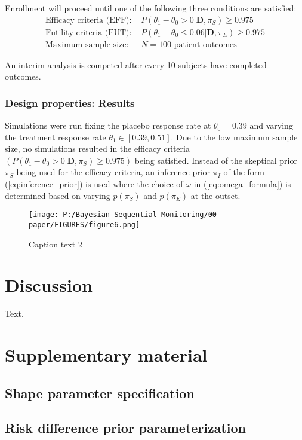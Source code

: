 \documentclass[12pt]{article}
\begin{document}
Enrollment will proceed until one of the following three conditions are satisfied:
\begin{align*}
\text{Efficacy criteria (EFF): }&P(\theta_1-\theta_0>0|\mathbf{D},\pi_S)\geq 0.975\\
\text{Futility criteria (FUT): }&P(\theta_1-\theta_0 \leq 0.06|\mathbf{D},\pi_E)\geq 0.975\\
\text{Maximum sample size: }&N=100 \text{ patient outcomes}
\end{align*}

An interim analysis is competed after every 10 subjects have completed outcomes.

\subsubsection{Design properties: Results}

Simulations were run fixing the placebo response rate at $\theta_0=0.39$ and varying the treatment response rate $\theta_1\in[0.39,0.51]$. Due to the low maximum sample size, no simulations resulted in the efficacy criteria $(P(\theta_1-\theta_0>0|\mathbf{D},\pi_S)\geq 0.975)$ being satisfied. Instead of the skeptical prior $\pi_S$ being used for the efficacy criteria, an inference prior $\pi_I$ of the form (\ref{eq:inference_prior}) is used where the choice of $\omega$ in (\ref{eq:omega_formula}) is determined based on varying $p(\pi_S)$ and $p(\pi_E)$ at the outset.

\begin{figure}
    \centering\texttt{[image: P:/Bayesian-Sequential-Monitoring/00-paper/FIGURES/figure6.png]}
    \caption{Caption text 2}
 \end{figure}


\section{Discussion}

Text.
\section{Supplementary material}
\subsection{Shape parameter specification}\label{sec:shapeParameterSpecification}
\subsection{Risk difference prior parameterization}\label{sec:riskDiffPriorParm}
\end{document}
